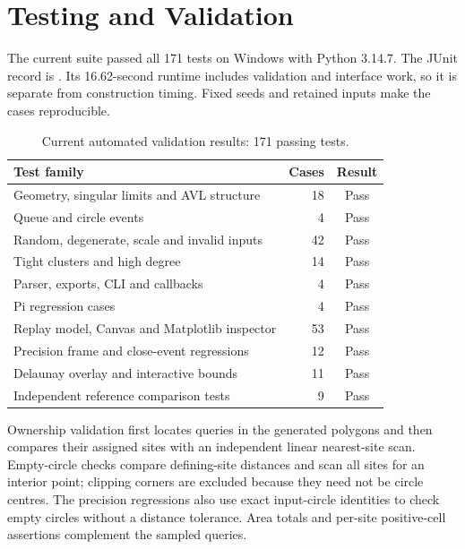 \clearpage
\section{Testing and Validation}
\label{sec:5}

The current suite passed all 171 tests on Windows with Python 3.14.7. The JUnit record is . Its 16.62-second runtime includes validation and interface work, so it is separate from construction timing. Fixed seeds and retained inputs make the cases reproducible.

\begin{table}[!htbp]
\centering
\caption{Current automated validation results: 171 passing tests.}
\label{tab:4}
\begin{tabularx}{\linewidth}{@{}Xrc@{}}
\toprule
\textbf{Test family} & \textbf{Cases} & \textbf{Result} \\
\midrule
Geometry, singular limits and AVL structure & 18 & Pass \\
Queue and circle events & 4 & Pass \\
Random, degenerate, scale and invalid inputs & 42 & Pass \\
Tight clusters and high degree & 14 & Pass \\
Parser, exports, CLI and callbacks & 4 & Pass \\
Pi regression cases & 4 & Pass \\
Replay model, Canvas and Matplotlib inspector & 53 & Pass \\
Precision frame and close-event regressions & 12 & Pass \\
Delaunay overlay and interactive bounds & 11 & Pass \\
Independent reference comparison tests & 9 & Pass \\
\bottomrule
\end{tabularx}
\end{table}

Ownership validation first locates queries in the generated polygons and then compares their assigned sites with an independent linear nearest-site scan. Empty-circle checks compare defining-site distances and scan all sites for an interior point; clipping corners are excluded because they need not be circle centres. The precision regressions also use exact input-circle identities to check empty circles without a distance tolerance. Area totals and per-site positive-cell assertions complement the sampled queries.

